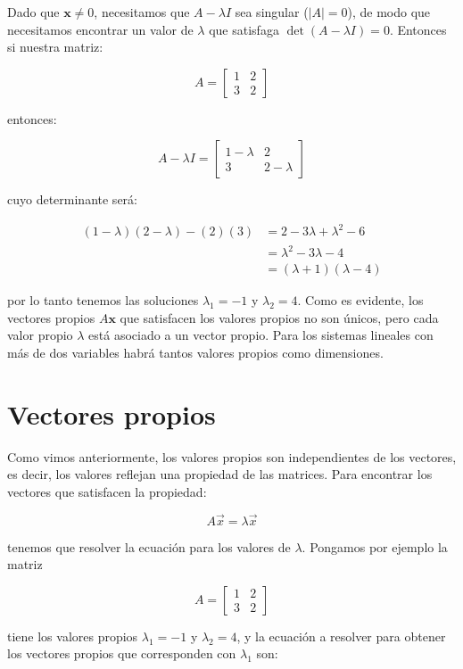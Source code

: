 \documentclass[
]{book}
\begin{document}
Dado que \(\mathbf{x} \neq 0\), necesitamos que \(A - \lambda I\) sea singular (\(|A| = 0\)), de modo que necesitamos encontrar un valor de \(\lambda\) que satisfaga \(\det (A - \lambda I) = 0\). Entonces si nuestra matriz:

\[A = \left[
\begin{array}{cc}
1 & 2 \\
3 & 2
\end{array}
\right]\]

entonces:

\[A - \lambda I = \left[
\begin{array}{cc}
1 - \lambda & 2 \\
3 & 2 - \lambda
\end{array}
\right]\]

cuyo determinante será:

\[\begin{align}
(1 - \lambda)(2-\lambda) - (2)(3) &= 2 - 3 \lambda +\lambda^2 -6\\
& = \lambda^2 - 3 \lambda -4 \\
& = (\lambda + 1)(\lambda - 4)
\end{align}\]

por lo tanto tenemos las soluciones \(\lambda_1 = -1\) y \(\lambda_2 = 4\). Como es evidente, los vectores propios \(A \mathbf{x}\) que satisfacen los valores propios no son únicos, pero cada valor propio \(\lambda\) está asociado a un vector propio. Para los sistemas lineales con más de dos variables habrá tantos valores propios como dimensiones.

\hypertarget{vectores-propios}{%
\section{Vectores propios}\label{vectores-propios}}

Como vimos anteriormente, los valores propios son independientes de los vectores, es decir, los valores reflejan una propiedad de las matrices. Para encontrar los vectores que satisfacen la propiedad:

\[A \vec{x} = \lambda \vec{x}\]

tenemos que resolver la ecuación para los valores de \(\lambda\). Pongamos por ejemplo la matriz

\[A = \left[\begin{array}{cc} 1 & 2 \\ 3 & 2 \end{array}\right]\]

tiene los valores propios \(\lambda_1 = -1\) y \(\lambda_2 = 4\), y la ecuación a resolver para obtener los vectores propios que corresponden con \(\lambda_1\) son:
\end{document}
